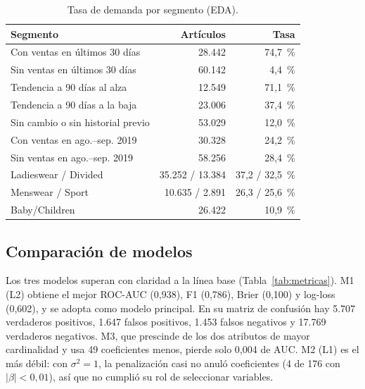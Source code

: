 \documentclass[
  journal=largetwo,
  manuscript=Laboratorio-Numero-02,
  year=2026,
  volume=1
]{cup-journal}
\begin{document}
\begin{table}[!ht]
\centering\footnotesize
\caption{Tasa de demanda por segmento (EDA).}
\label{tab:segmentos}
\begin{tabular}{@{}lrr@{}}
\toprule
Segmento & Artículos & Tasa \\
\midrule
Con ventas en últimos 30 días & 28.442 & 74,7~\% \\
Sin ventas en últimos 30 días & 60.142 & 4,4~\% \\
Tendencia a 90 días al alza & 12.549 & 71,1~\% \\
Tendencia a 90 días a la baja & 23.006 & 37,4~\% \\
Sin cambio o sin historial previo & 53.029 & 12,0~\% \\
Con ventas en ago.--sep. 2019 & 30.328 & 24,2~\% \\
Sin ventas en ago.--sep. 2019 & 58.256 & 28,4~\% \\
Ladieswear / Divided & 35.252 / 13.384 & 37,2 / 32,5~\% \\
Menswear / Sport & 10.635 / 2.891 & 26,3 / 25,6~\% \\
Baby/Children & 26.422 & 10,9~\% \\
\bottomrule
\end{tabular}
\end{table}

\subsection{Comparación de modelos}

Los tres modelos superan con claridad a la línea base (Tabla~\ref{tab:metricas}). M1 (L2) obtiene el mejor ROC-AUC (0,938), F1 (0,786), Brier (0,100) y log-loss (0,602), y se adopta como modelo principal. En su matriz de confusión hay 5.707 verdaderos positivos, 1.647 falsos positivos, 1.453 falsos negativos y 17.769 verdaderos negativos. M3, que prescinde de los dos atributos de mayor cardinalidad y usa 49 coeficientes menos, pierde solo 0,004 de AUC. M2 (L1) es el más débil: con $\sigma^2=1$, la penalización casi no anuló coeficientes (4 de 176 con $|\beta|<0{,}01$), así que no cumplió su rol de seleccionar variables.
\end{document}
